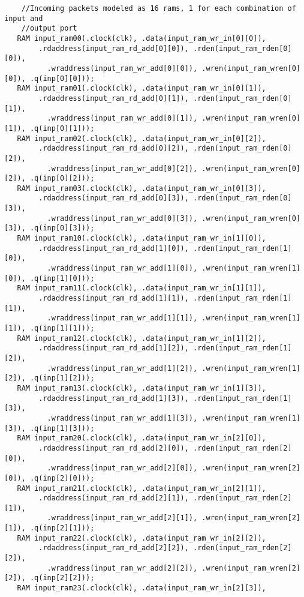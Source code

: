 \documentclass[twoside,12pt,fleqn]{book} %
\begin{document}
\begin{lstlisting}
    //Incoming packets modeled as 16 rams, 1 for each combination of input and
    //output port
   RAM input_ram00(.clock(clk), .data(input_ram_wr_in[0][0]),
        .rdaddress(input_ram_rd_add[0][0]), .rden(input_ram_rden[0][0]),
          .wraddress(input_ram_wr_add[0][0]), .wren(input_ram_wren[0][0]), .q(inp[0][0]));
   RAM input_ram01(.clock(clk), .data(input_ram_wr_in[0][1]),
        .rdaddress(input_ram_rd_add[0][1]), .rden(input_ram_rden[0][1]),
          .wraddress(input_ram_wr_add[0][1]), .wren(input_ram_wren[0][1]), .q(inp[0][1]));
   RAM input_ram02(.clock(clk), .data(input_ram_wr_in[0][2]),
        .rdaddress(input_ram_rd_add[0][2]), .rden(input_ram_rden[0][2]),
          .wraddress(input_ram_wr_add[0][2]), .wren(input_ram_wren[0][2]), .q(inp[0][2]));
   RAM input_ram03(.clock(clk), .data(input_ram_wr_in[0][3]),
        .rdaddress(input_ram_rd_add[0][3]), .rden(input_ram_rden[0][3]),
          .wraddress(input_ram_wr_add[0][3]), .wren(input_ram_wren[0][3]), .q(inp[0][3]));
   RAM input_ram10(.clock(clk), .data(input_ram_wr_in[1][0]),
        .rdaddress(input_ram_rd_add[1][0]), .rden(input_ram_rden[1][0]),
          .wraddress(input_ram_wr_add[1][0]), .wren(input_ram_wren[1][0]), .q(inp[1][0]));
   RAM input_ram11(.clock(clk), .data(input_ram_wr_in[1][1]),
        .rdaddress(input_ram_rd_add[1][1]), .rden(input_ram_rden[1][1]),
          .wraddress(input_ram_wr_add[1][1]), .wren(input_ram_wren[1][1]), .q(inp[1][1]));
   RAM input_ram12(.clock(clk), .data(input_ram_wr_in[1][2]),
        .rdaddress(input_ram_rd_add[1][2]), .rden(input_ram_rden[1][2]),
          .wraddress(input_ram_wr_add[1][2]), .wren(input_ram_wren[1][2]), .q(inp[1][2]));
   RAM input_ram13(.clock(clk), .data(input_ram_wr_in[1][3]),
        .rdaddress(input_ram_rd_add[1][3]), .rden(input_ram_rden[1][3]),
          .wraddress(input_ram_wr_add[1][3]), .wren(input_ram_wren[1][3]), .q(inp[1][3]));
   RAM input_ram20(.clock(clk), .data(input_ram_wr_in[2][0]),
        .rdaddress(input_ram_rd_add[2][0]), .rden(input_ram_rden[2][0]),
          .wraddress(input_ram_wr_add[2][0]), .wren(input_ram_wren[2][0]), .q(inp[2][0]));
   RAM input_ram21(.clock(clk), .data(input_ram_wr_in[2][1]),
        .rdaddress(input_ram_rd_add[2][1]), .rden(input_ram_rden[2][1]),
          .wraddress(input_ram_wr_add[2][1]), .wren(input_ram_wren[2][1]), .q(inp[2][1]));
   RAM input_ram22(.clock(clk), .data(input_ram_wr_in[2][2]),
        .rdaddress(input_ram_rd_add[2][2]), .rden(input_ram_rden[2][2]),
          .wraddress(input_ram_wr_add[2][2]), .wren(input_ram_wren[2][2]), .q(inp[2][2]));
   RAM input_ram23(.clock(clk), .data(input_ram_wr_in[2][3]),

\end{lstlisting}
\end{document}
